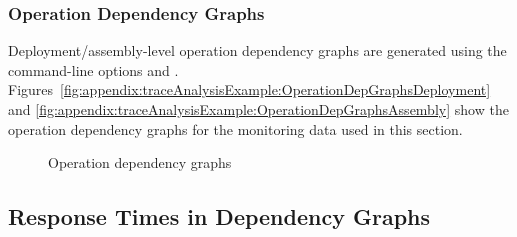 \pagebreak

\subsubsection{Operation Dependency Graphs}

Deployment/assembly-level operation dependency graphs are generated using the %
command-line options \OPT{\OPTplotDeploymentOperationDependencyGraph} and %
\OPT{\OPTplotAssemblyOperationDependencyGraph}. %
Figures~\ref{fig:appendix:traceAnalysisExample:OperationDepGraphsDeployment} and %
\ref{fig:appendix:traceAnalysisExample:OperationDepGraphsAssembly} show the %
operation dependency graphs for the monitoring data used in this section. 

\begin{figure}[ht]\centering
{}
\caption{Operation dependency graphs}
\label{fig:appendix:traceAnalysisExample:OperationDepGraphs}
\end{figure}

\pagebreak

\subsection{Response Times in Dependency Graphs}

